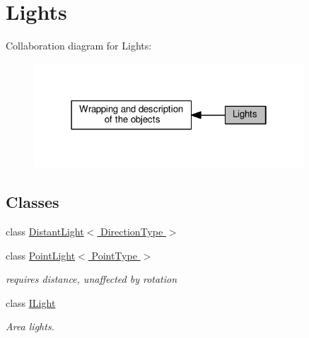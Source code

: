 \hypertarget{group__lights}{}\section{Lights}
\label{group__lights}
Collaboration diagram for Lights\+:
\nopagebreak
\begin{figure}[H]
\begin{center}
\leavevmode
\includegraphics[width=286pt]{group__lights}
\end{center}
\end{figure}
\subsection*{Classes}
\begin{DoxyCompactItemize}
\item 
class \hyperlink{class_distant_light}{Distant\+Light$<$ Direction\+Type $>$}
\item 
class \hyperlink{class_point_light}{Point\+Light$<$ Point\+Type $>$}
\begin{DoxyCompactList}\small\item\em requires distance, unaffected by rotation \end{DoxyCompactList}\item 
class \hyperlink{class_i_light}{I\+Light}
\begin{DoxyCompactList}\small\item\em Area lights. \end{DoxyCompactList}\end{DoxyCompactItemize}
